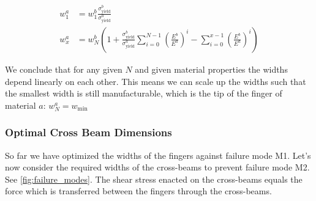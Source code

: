 \begin{align}
	w_1^a &= w_1^b \frac{\sigma^b_\text{yield}}{\sigma^a_\text{yield}} \label{eq:width_a_1} \\
	w^a_x &= w^b_N \left( 1 + \frac{\sigma^b_\text{yield}}{\sigma^a_\text{yield}} \sum\limits_{i=0}^{N-1} \left(\frac{E^b}{E^a}\right)^i  - \sum\limits_{i=0}^{x-1} \left(\frac{E^b}{E^a}\right)^i  \right) \label{eq:widths_a}
\end{align}

We conclude that for any given $N$ and given material properties the widths depend linearly on each other.
This means we can scale up the widths such that the smallest width is still manufacturable,
which is the tip of the finger of material $a$:
$w^a_N = w_\text{min}$







\subsubsection{Optimal Cross Beam Dimensions}
So far we have optimized the widths of the fingers against failure mode M1.
Let's now consider the required widths of the cross-beams to prevent failure mode M2.
See \cref{fig:failure_modes}.
The shear stress enacted on the cross-beams equals the force which is transferred between the fingers through the cross-beams.


